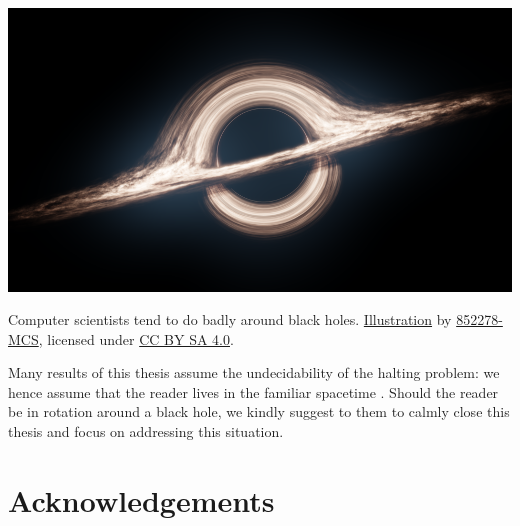 \begin{marginfigure}
	\centering
	\includegraphics[width=\linewidth]{fig/intro/black-hole.png}
	\caption{
		Computer scientists tend to do badly around black holes.
		\href{https://commons.wikimedia.org/wiki/File:Black_Hole_Full.png}{Illustration}
		by \href{https://commons.wikimedia.org/wiki/User:852278-MCS}{852278-MCS},
		licensed under \href{https://creativecommons.org/licenses/by-sa/4.0/deed.en}{CC BY SA 4.0}.
	}
\end{marginfigure}
Many results of this thesis assume the undecidability of the halting problem:
we hence assume that the reader lives in the familiar spacetime \cite{Hogarth1994NonTuring}.
Should the reader be in rotation around a black hole, we kindly suggest
to them to calmly close this thesis and focus on addressing this situation.

\section*{Acknowledgements}

